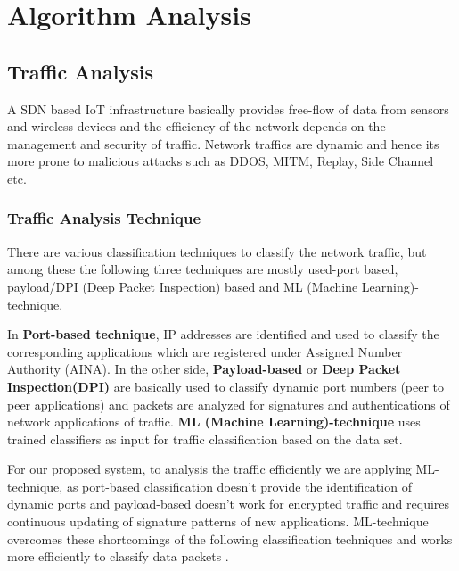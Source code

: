 \chapter{Algorithm Analysis}

\section{Traffic Analysis}



A SDN based IoT infrastructure basically provides free-flow of data from sensors and wireless devices and the efficiency of the network depends on the management and security of traffic. Network traffics are dynamic and hence its more prone to malicious attacks such as DDOS, MITM, Replay, Side Channel etc.

\subsection{Traffic Analysis Technique}

There are various classification techniques to classify the network traffic, but among these the following three techniques are mostly used-port based, payload/DPI (Deep Packet Inspection) based and ML (Machine Learning)-technique.

In \textbf{Port-based technique}, IP addresses are identified and used to classify the corresponding applications which are registered under Assigned Number Authority (AINA). In the other side, \textbf{Payload-based} or \textbf{Deep Packet Inspection(DPI)} are basically used to classify dynamic port numbers (peer to peer applications) and packets are analyzed for signatures and authentications of network applications of traffic.\textbf{ ML (Machine Learning)-technique} uses trained classifiers as input for traffic classification based on the data set.

For our proposed system, to analysis the traffic efficiently we are applying ML-technique, as port-based classification doesn’t provide the identification of dynamic ports and payload-based doesn’t work for encrypted traffic and requires continuous updating of signature patterns of new applications. ML-technique overcomes these shortcomings of the following classification techniques and works more efficiently to classify data packets \cite{6091325,Santi-journal}.


